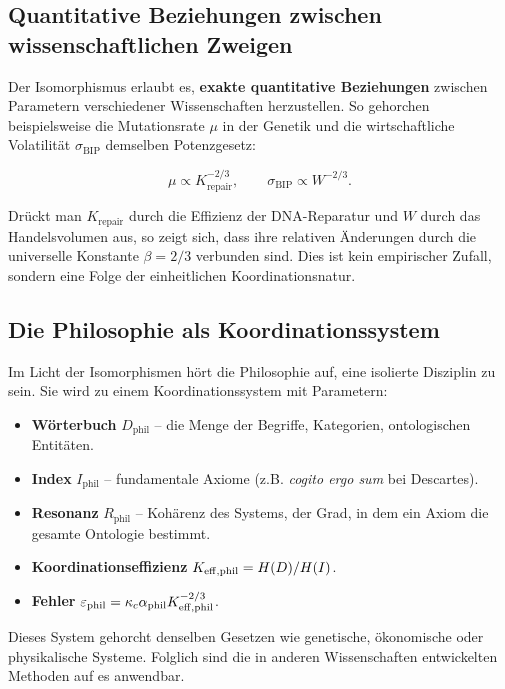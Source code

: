 \documentclass[12pt,a4paper]{article}
\newcommand{\kappac}{\kappa_c}
\newcommand{\eps}{\varepsilon}
\newcommand{\betaf}{\beta}
\begin{document}
	\subsection{Quantitative Beziehungen zwischen wissenschaftlichen Zweigen}
	
	Der Isomorphismus erlaubt es, \textbf{exakte quantitative Beziehungen} zwischen Parametern verschiedener Wissenschaften herzustellen. So gehorchen beispielsweise die Mutationsrate \(\mu\) in der Genetik und die wirtschaftliche Volatilität \(\sigma_{\mathrm{BIP}}\) demselben Potenzgesetz:
	
	\[
	\mu \propto K_{\mathrm{repair}}^{-2/3}, \qquad \sigma_{\mathrm{BIP}} \propto W^{-2/3}.
	\]
	
	Drückt man \(K_{\mathrm{repair}}\) durch die Effizienz der DNA-Reparatur und \(W\) durch das Handelsvolumen aus, so zeigt sich, dass ihre relativen Änderungen durch die universelle Konstante \(\betaf = 2/3\) verbunden sind. Dies ist kein empirischer Zufall, sondern eine Folge der einheitlichen Koordinationsnatur.
	
	\subsection{Die Philosophie als Koordinationssystem}
	
	Im Licht der Isomorphismen hört die Philosophie auf, eine isolierte Disziplin zu sein. Sie wird zu einem Koordinationssystem mit Parametern:
	
	\begin{itemize}
		\item \textbf{Wörterbuch} \(D_{\text{phil}}\) – die Menge der Begriffe, Kategorien, ontologischen Entitäten.
		\item \textbf{Index} \(I_{\text{phil}}\) – fundamentale Axiome (z.B. \textit{cogito ergo sum} bei Descartes).
		\item \textbf{Resonanz} \(R_{\text{phil}}\) – Kohärenz des Systems, der Grad, in dem ein Axiom die gesamte Ontologie bestimmt.
		\item \textbf{Koordinationseffizienz} \(\Keff[\text{phil}] = H(D)/H(I)\).
		\item \textbf{Fehler} \(\eps_{\text{phil}} = \kappac \alpha_{\text{phil}} \Keff[\text{phil}]^{-2/3}\).
	\end{itemize}
	
	Dieses System gehorcht denselben Gesetzen wie genetische, ökonomische oder physikalische Systeme. Folglich sind die in anderen Wissenschaften entwickelten Methoden auf es anwendbar.
	
\end{document}
